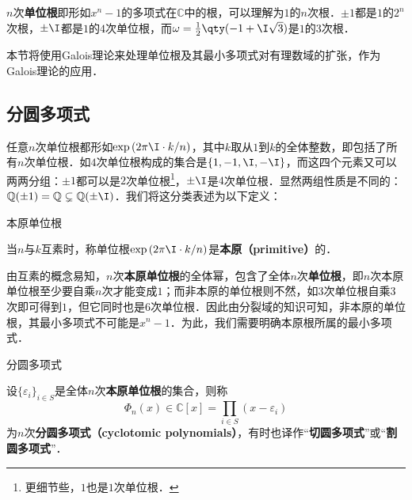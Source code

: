 




$n$次\textbf{单位根}即形如$x^n-1$的多项式在$\mathbb{C}$中的根，可以理解为$1$的$n$次根．$\pm 1$都是$1$的$2^n$次根，$\pm \I$都是$1$的$4$次单位根，而$\omega=\frac{1}{2}\qty(-1+\I\sqrt{3})$是$1$的$3$次根．

本节将使用Galois理论来处理单位根及其最小多项式对有理数域的扩张，作为Galois理论的应用．


\subsection{分圆多项式}

任意$n$次单位根都形如$\exp{(2\pi\I\cdot  k/n)}$，其中$k$取从$1$到$k$的全体整数，即包括了所有$n$次单位根．如$4$次单位根构成的集合是$\{1, -1, \I, -\I\}$，而这四个元素又可以两两分组：$\pm 1$都可以是$2$次单位根\footnote{更细节些，$1$也是$1$次单位根．}，$\pm \I$是$4$次单位根．显然两组性质是不同的：$\mathbb{Q}(\pm 1)=\mathbb{Q}\subsetneq \mathbb{Q}(\pm\I)$．我们将这分类表述为以下定义：

\begin{definition}{本原单位根}\label{Cycltm_def2}

当$n$与$k$互素时，称单位根$\exp{(2\pi\I\cdot  k/n)}$是\textbf{本原（primitive）}的．

\end{definition}

由互素的概念易知，$n$次\textbf{本原单位根}的全体幂，包含了全体$n$次\textbf{单位根}，即$n$次本原单位根至少要自乘$n$次才能变成$1$；而非本原的单位根则不然，如$3$次单位根自乘$3$次即可得到$1$，但它同时也是$6$次单位根．因此由分裂域的知识可知，非本原的单位根，其最小多项式不可能是$x^n-1$．为此，我们需要明确本原根所属的最小多项式．

\begin{definition}{分圆多项式}\label{Cycltm_def1}

设$\{\varepsilon_i\}_{i\in S}$是全体$n$次\textbf{本原单位根}的集合，则称
\begin{equation}
\Phi_n(x)\in \mathbb{C}[x] = \prod_{i\in S}(x-\varepsilon_i)
\end{equation}
为$n$次\textbf{分圆多项式（cyclotomic polynomials）}，有时也译作“\textbf{切圆多项式}”或“\textbf{割圆多项式}”．

\end{definition}

